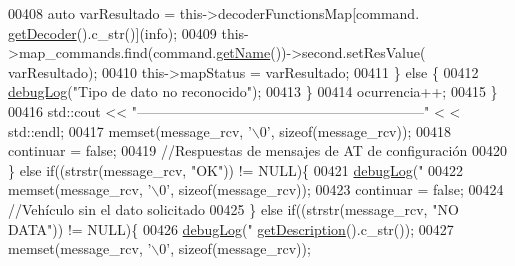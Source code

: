 \begin{DoxyCode}
{{{{{{{{{{{00408                                     \textcolor{keyword}{auto} varResultado = this->decoderFunctionsMap[command.
      \hyperlink{classCommands_a8b4c2a655d8dd3de334338d6684d469c}{getDecoder}().c\_str()](info);
00409                                     this->map\_commands.find(command.\hyperlink{classCommands_adf3d8a96310b1f4e57a6ecf0f2f153ea}{getName}())->second.setResValue(
      varResultado);
00410                                     this->mapStatus = varResultado;
00411                                 \} \textcolor{keywordflow}{else} \{
00412                                     \hyperlink{debug_8hpp_a55f41cf7b0585224496de3d7adbc101c}{debugLog}(\textcolor{stringliteral}{"Tipo de dato no reconocido"});
00413                                 \}
00414                                 ocurrencia++;
00415                             \}
00416                             std::cout << \textcolor{stringliteral}{"--------------------------------------------------------------"} <
      < std::endl;
00417                             memset(message\_rcv, \textcolor{charliteral}{'\(\backslash\)0'}, \textcolor{keyword}{sizeof}(message\_rcv));
00418                             continuar = \textcolor{keyword}{false};
00419                             \textcolor{comment}{//Respuestas de mensajes de AT de configuración}
00420                         \} \textcolor{keywordflow}{else} \textcolor{keywordflow}{if}((strstr(message\_rcv, \textcolor{stringliteral}{"OK"})) != NULL)\{
00421                             \hyperlink{debug_8hpp_a55f41cf7b0585224496de3d7adbc101c}{debugLog}(\textcolor{stringliteral}{"%
00422                             memset(message\_rcv, \textcolor{charliteral}{'\(\backslash\)0'}, \textcolor{keyword}{sizeof}(message\_rcv));                         
00423                             continuar = \textcolor{keyword}{false};
00424                             \textcolor{comment}{//Vehículo sin el dato solicitado}
00425                         \} \textcolor{keywordflow}{else} \textcolor{keywordflow}{if}((strstr(message\_rcv, \textcolor{stringliteral}{"NO DATA"})) != NULL)\{
00426                             \hyperlink{debug_8hpp_a55f41cf7b0585224496de3d7adbc101c}{debugLog}(\textcolor{stringliteral}{"%
      \hyperlink{classCommands_ad82fe7dfcf1908423bdb59d048020e26}{getDescription}().c\_str());
00427                             memset(message\_rcv, \textcolor{charliteral}{'\(\backslash\)0'}, \textcolor{keyword}{sizeof}(message\_rcv));                         
}}}}}}}}}}}}}
\end{DoxyCode}
